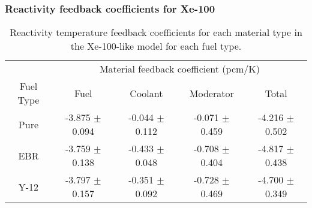 \begin{frame}
    \frametitle{Reactivity feedback coefficients for Xe-100}
    \begin{table}[ht]
        \centering
        \caption{Reactivity temperature feedback coefficients for 
        each material type in the Xe-100-like model for each fuel 
        type.}
        \label{tab:coeff_xe100}
        \begin{tabular}{c c c c c}
            \hline 
            & \multicolumn{4}{c}{Material feedback coefficient (pcm/K)} \\
            Fuel Type & Fuel & Coolant & Moderator & Total \\
            \hline
            Pure & -3.875 $\pm$ 0.094 & -0.044 $\pm$ 0.112 & -0.071 $\pm$ 0.459 & -4.216 $\pm$ 0.502\\
            \gls{EBR} & -3.759 $\pm$ 0.138 & -0.433 $\pm$ 0.048 & -0.708 $\pm$ 0.404 & -4.817 $\pm$ 0.438\\
            Y-12 & -3.797 $\pm$ 0.157 & -0.351 $\pm$ 0.092 & -0.728 $\pm$ 0.469 & -4.700 $\pm$ 0.349\\
            \hline

        \end{tabular}
\end{table}
\end{frame}